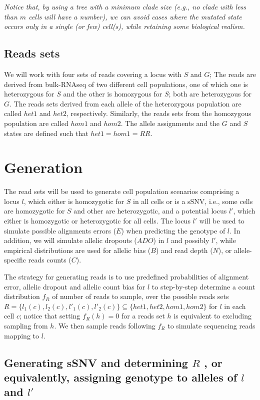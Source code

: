 \documentclass[a4paper,11pt]{article}
\begin{document}
\emph{Notice that, by using a tree with a minimum clade size (e.g., no clade
  with less than $m$ cells will have a number), we can avoid cases
  where the mutated state occurs only in a single (or few) cell(s),
  while retaining some biological realism.}


\subsection{Reads sets}
\label{sec:reads-sets}


 We will work with four sets of reads covering a locus with $S$
and $G$; The reads are derived from bulk-RNAseq of two different cell
populations, one of which one is heterozygous for $S$ and the other is
homozygous for $S$; both are heterozygous for $G$. The reads sets
derived from each allele of the heterozygous population are called
$het1$ and $het2$, respectively. Similarly, the reads sets from the
homozygous population are called $hom1$ and $hom2$. The allele
assignments and the $G$ and $S$ states are defined such that
$het1=hom1=RR$.


\section{Generation}
\label{sec:generation}
The read sets will be used to generate cell population scenarios
comprising a locus $l$, which either is homozygotic for $S$ in all
cells or is a sSNV, i.e., some cells are homozygotic for $S$ and other
are heterozygotic, and a potential locus $l'$, which either is
homozygotic or heterozygotic for all cells.  The locus $l'$ will be
used to simulate possible alignments errors ($E$) when predicting the
genotype of $l$.
%
In addition, we will simulate allelic dropouts ($ADO$) in $l$ and
possibly $l'$, while empirical distributions are used for allelic bias
($B$) and read depth ($N$), or allele-specific reads counts ($C$).

The strategy for generating reads is to use predefined probabilities
of alignment error, allelic dropout and allelic count bias for $l$ to
step-by-step determine a count distribution $f_R$ of number of reads
to sample, over the possible reads sets
$R=\{l_1(c), l_2(c), l'_1(c), l'_2(c)\}\subseteq\{het1, het2, hom1,
hom2\}$ for $l$ in each cell $c$; notice that setting $f_R(h)=0$ for a
reads set $h$ is equivalent to excluding sampling from $h$. We then
sample reads following $f_R$ to simulate sequencing reads mapping to
$l$.


\subsection{Generating sSNV and determining $R$ , or equivalently, assigning genotype to alleles of $l$ and $l'$}
\label{sec:generating-ssnv}
\end{document}
